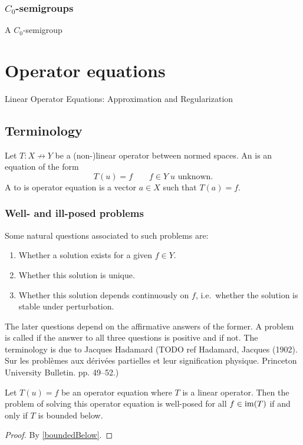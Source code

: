 \begin{definition}

\end{definition}

\subsection{$C_0$-semigroups}
\begin{definition}
A $C_0$-semigroup
\end{definition}

\chapter{Operator equations}
Linear Operator Equations: Approximation and Regularization
\section{Terminology}
\begin{definition}
Let $T: X\not\to Y$ be a (non-)linear operator between normed spaces. An  is an equation of the form
\[ T(u) = f \qquad f\in Y\; \text{$u$ unknown.} \]
A  to is operator equation is a vector $a\in X$ such that $T(a) = f$.
\end{definition}
\subsection{Well- and ill-posed problems}
Some natural questions associated to such problems are:
\begin{enumerate}
\item Whether a solution exists for a given $f\in Y$.
\item Whether this solution is unique.
\item Whether this solution depends continuously on $f$, i.e.\ whether the solution is stable under perturbation.
\end{enumerate}
The later questions depend on the affirmative answers of the former. A problem is called  if the answer to all three questions is positive and  if not. The terminology is due to Jacques Hadamard (TODO ref Hadamard, Jacques (1902). Sur les problèmes aux dérivées partielles et leur signification physique. Princeton University Bulletin. pp. 49–52.)

\begin{proposition}
Let $ T(u) = f$ be an operator equation where $T$ is a linear operator. Then the problem of solving this operator equation is well-posed for all $f\in\operatorname{im}(T)$ \textup{if and only if} $T$ is bounded below.
\end{proposition}
\begin{proof}
By \ref{boundedBelow}.
\end{proof}

